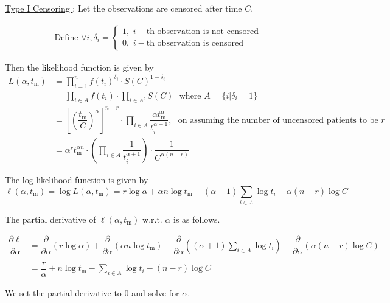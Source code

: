 \documentclass[12pt, a4paper, onecolumn, answers]{exam}
\begin{document}
\begin{questions}
\begin{solution}
\leftpointright \hspace{0.1cm} \underline{Type I Censoring } : Let the observations are censored after time $C$.

\begin{align*}
\text{Define } \forall i, \delta_i = \begin{cases} 1, \,\, i-\text{th observation is not censored} \\ 0, \,\, i-\text{th observation is censored} \end{cases}
\end{align*}

Then the likelihood function is given by
\begin{align*}
L(\alpha, t_\mathrm{m}) &= \prod_{i=1}^{n} f(t_i)^{\delta_i} \cdot S(C)^{1 - \delta_i} \\[0.25em]
&= \prod_{i \in A} f(t_i) \cdot \prod_{i \in A^c} S(C) \,\,\,\, \text{where } A = \{i | \delta_i = 1\} \\[0.25em]
&= \left[ \left( \dfrac{t_{\mathrm{m}}}{C} \right)^{\alpha} \right]^{n - r} \cdot \prod_{i \in A} \dfrac{\alpha t_{\mathrm{m}}^\alpha}{t_i^{\alpha + 1}},\,\,\,\, \text{on assuming the number of uncensored patients to be } r \\[0.25em]
&= \alpha^r t_{\mathrm{m}}^{\alpha n} \cdot \left( \prod_{i \in A} \dfrac{1}{t_i^{\alpha + 1}} \right) \cdot \dfrac{1}{C^{\alpha(n - r)}}
\end{align*}

The log-likelihood function is given by
$$\ell(\alpha, t_\mathrm{m}) = \log L(\alpha, t_\mathrm{m}) = r \log \alpha + \alpha n \log t_{\mathrm{m}} - (\alpha + 1) \sum_{i \in A} \log t_i - \alpha(n - r) \log C$$

The partial derivative of $\ell(\alpha, t_\mathrm{m})$ w.r.t. $\alpha$ is as follows.

\begin{align*}
\dfrac{\partial \ell}{\partial \alpha} 
&= \dfrac{\partial}{\partial \alpha} \left( r \log \alpha \right)
 + \dfrac{\partial}{\partial \alpha} \left( \alpha n \log t_{\mathrm{m}} \right)
 - \dfrac{\partial}{\partial \alpha} \left( (\alpha + 1) \sum_{i \in A} \log t_i \right)
 - \dfrac{\partial}{\partial \alpha} \left( \alpha(n - r) \log C \right) \\
\\
&= \dfrac{r}{\alpha} + n \log t_{\mathrm{m}} 
   - \sum_{i \in A} \log t_i 
   - (n - r) \log C
\end{align*}

We set the partial derivative to 0 and solve for $\alpha$.


\end{solution}
\end{questions}
\end{document}
